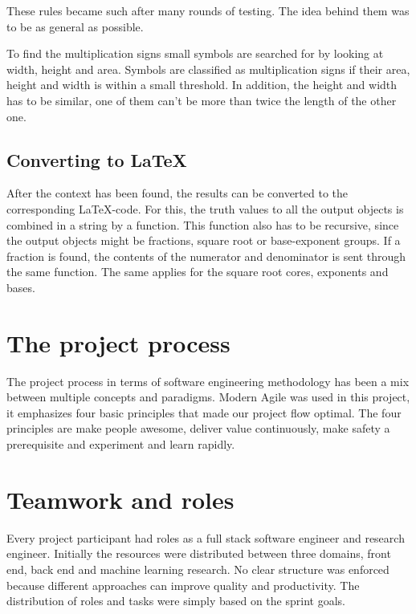 These rules became such after many rounds of testing. The idea behind them was to be as general as possible.

To find the multiplication signs small symbols are searched for by looking at width, height and area. Symbols are classified as multiplication signs if their area, height and width is within a small threshold. In addition, the height and width has to be similar, one of them can't be more than twice the length of the other one.



\subsection{Converting to \LaTeX}
After the context has been found, the results can be converted to the corresponding \LaTeX -code. For this, the truth values to all the output objects is combined in a string by a function. This function also has to be recursive, since the output objects might be fractions, square root or base-exponent groups. If a fraction is found, the contents of the numerator and denominator is sent through the same function. The same applies for the square root cores, exponents and bases.

\section{The project process} %
The project process in terms of software engineering methodology has been a mix between multiple concepts and paradigms. Modern Agile was used in this project, it emphasizes four basic principles that made our project flow optimal. The four principles are make people awesome, deliver value continuously, make safety a prerequisite and experiment and learn rapidly. \cite{agile_modern_????}


\section{Teamwork and roles} %
Every project participant had roles as a full stack software engineer and research engineer. Initially the resources were distributed between three domains, front end, back end and machine learning research. No clear structure was enforced because different approaches can improve quality and productivity. The distribution of roles and tasks were simply based on the sprint goals.



